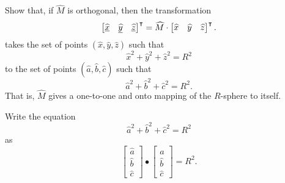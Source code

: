 \documentclass[newpage,hints,handout]{ximera}
\begin{document}
\begin{problem}
  Show that, if $\hat{M}$ is orthogonal, then the transformation
  \[
  \begin{bmatrix}
    \underline{\widehat{x}} & \underline{\widehat{y}} & \underline{\widehat{z}}
  \end{bmatrix}^\intercal
  =\widehat M \cdot \begin{bmatrix}
    \widehat{x} & \widehat{y} & \widehat{z}
  \end{bmatrix}^\intercal.
  \]
  takes the set of points $\left(\hat{x},\hat{y},\hat{z}\right)$ such
  that
\[
\hat{x}^2 + \hat{y}^2 + \hat{z}^2 = R^2
\]
to the set of points
$\left({\hat{a}},{\hat{b}},{\hat{c}}\right)$
such that
\[
{\hat{a}}^2 + {\hat{b}}^{2} +{\hat{c}}^{2}=R^2.
\]
That is, $\hat{M}$ gives a one-to-one and onto mapping of the $R$-sphere to
itself.
\begin{hint}
  Write the equation
  \[
 {\hat{a}}^2 +{\hat{b}}^{2} + {\hat{c}}^{2}=R^2
  \]
  as
  \[
  \begin{bmatrix}
    {\hat{a}} \\ {\hat{b}} \\ {\hat{c}}%
  \end{bmatrix}  
  \bullet
  \begin{bmatrix}
    {\hat{a}} \\ {\hat{b}} \\ {\hat{c}}
  \end{bmatrix}=R^2.
  \]
\end{hint}


\end{problem}
\end{document}
